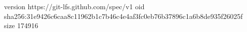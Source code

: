 version https://git-lfs.github.com/spec/v1
oid sha256:31e9426c6caa8c11962b1c7b46c4e4af3fc0eb76b37896c1a6b8de935f26025f
size 174916
